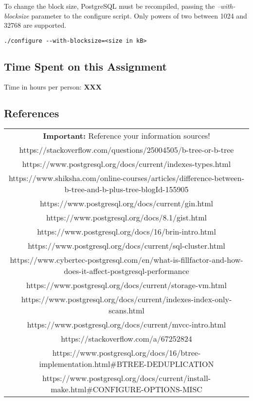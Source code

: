 \documentclass[11pt]{scrartcl}
\begin{document}
To change the block size, PostgreSQL must be recompiled, passing the \textit{--with-blocksize} parameter to the configure script. Only powers of two between 1024 and 32768 are supported.

\begin{lstlisting}
./configure --with-blocksize=<size in kB>
\end{lstlisting}

\subsection*{Time Spent on this Assignment}

Time in hours per person: \textbf{XXX}

\subsection*{References}

\begin{table}[H]
  \centering
  \begin{tabular}{c}
    \hline
    \textbf{Important:} Reference your information sources! \tabularnewline
    https://stackoverflow.com/questions/25004505/b-tree-or-b-tree \tabularnewline
    https://www.postgresql.org/docs/current/indexes-types.html \tabularnewline
    https://www.shiksha.com/online-courses/articles/difference-between-b-tree-and-b-plus-tree-blogId-155905 \tabularnewline
    https://www.postgresql.org/docs/current/gin.html \tabularnewline
    https://www.postgresql.org/docs/8.1/gist.html \tabularnewline
    https://www.postgresql.org/docs/16/brin-intro.html \tabularnewline
    https://www.postgresql.org/docs/current/sql-cluster.html \tabularnewline
    https://www.cybertec-postgresql.com/en/what-is-fillfactor-and-how-does-it-affect-postgresql-performance \tabularnewline
    https://www.postgresql.org/docs/current/storage-vm.html \tabularnewline
    https://www.postgresql.org/docs/current/indexes-index-only-scans.html \tabularnewline
    https://www.postgresql.org/docs/current/mvcc-intro.html \tabularnewline
    https://stackoverflow.com/a/67252824 \tabularnewline
    https://www.postgresql.org/docs/16/btree-implementation.html\#BTREE-DEDUPLICATION \tabularnewline
    https://www.postgresql.org/docs/current/install-make.html\#CONFIGURE-OPTIONS-MISC\tabularnewline
    \hline
  \end{tabular}
\end{table}
\end{document}
